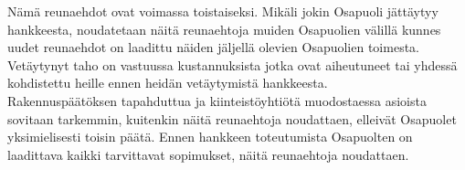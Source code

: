\documentclass[a4paper, 12pt, finnish]{report}
\begin{document}
Nämä reunaehdot ovat voimassa toistaiseksi.
Mikäli jokin Osapuoli jättäytyy hankkeesta, noudatetaan näitä reunaehtoja muiden Osapuolien välillä kunnes uudet reunaehdot on laadittu näiden jäljellä olevien Osapuolien toimesta.
Vetäytynyt taho on vastuussa kustannuksista jotka ovat aiheutuneet tai yhdessä kohdistettu heille ennen heidän vetäytymistä hankkeesta.\\

Rakennuspäätöksen tapahduttua ja kiinteistöyhtiötä muodostaessa asioista sovitaan tarkemmin, kuitenkin näitä reunaehtoja noudattaen, elleivät Osapuolet yksimielisesti toisin päätä.
Ennen hankkeen toteutumista Osapuolten on laadittava kaikki tarvittavat sopimukset, näitä reunaehtoja noudattaen.
\end{document}
